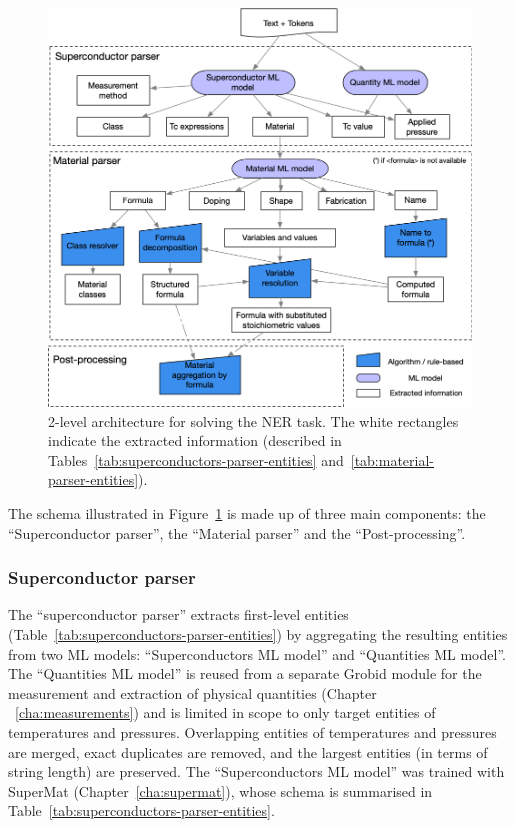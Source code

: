 \begin{figure}[htbp]
    \includegraphics[width=\textwidth]{figures/automatic_extraction_supercon/schema-extraction-colors}
    \caption{\label{fig:extraction-ml-models-cascade-architecture} 2-level architecture for solving the NER task. The white rectangles indicate the extracted information (described in Tables~\ref{tab:superconductors-parser-entities} and~\ref{tab:material-parser-entities}).}
\end{figure}

The schema illustrated in Figure~\ref{fig:extraction-ml-models-cascade-architecture} is made up of three main components: the ``Superconductor parser'', the ``Material parser'' and the ``Post-processing''. 

\subsubsection{Superconductor parser}
\label{Superconductor parser}
The ``superconductor parser'' extracts first-level entities (Table~\ref{tab:superconductors-parser-entities}) by aggregating the resulting entities from two ML models: ``Superconductors ML model'' and ``Quantities ML model''.
The ``Quantities ML model'' is reused from a separate Grobid module for the measurement and extraction of physical quantities (Chapter ~\ref{cha:measurements}) and is limited in scope to only target entities of temperatures and pressures.
Overlapping entities of temperatures and pressures are merged, exact duplicates are removed, and the largest entities (in terms of string length) are preserved.
The ``Superconductors ML model'' was trained with SuperMat (Chapter~\ref{cha:supermat}), whose schema is summarised in Table~\ref{tab:superconductors-parser-entities}.

